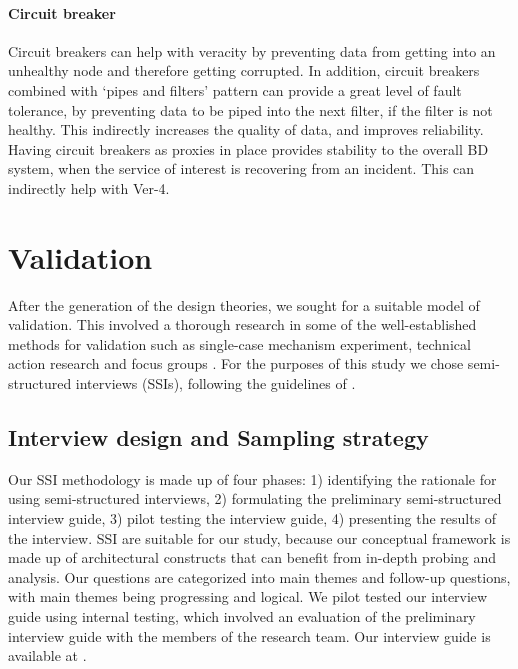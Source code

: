 \documentclass[a4paper,11pt,article,oneside]{memoir}
\begin{document}
\subsubsection{Circuit breaker}
 
 Circuit breakers can help with veracity by preventing data from getting into an unhealthy node and therefore getting corrupted. In addition, circuit breakers combined with `pipes and filters' pattern can provide a great level of fault tolerance, by preventing data to be piped into the next filter, if the filter is not healthy. This indirectly increases the quality of data, and improves reliability. Having circuit breakers as proxies in place provides stability to the overall BD system, when the service of interest is recovering from an incident. This can indirectly help with Ver-4.


\chapter{Validation}

After the generation of the design theories, we sought for a suitable model of validation. This involved a thorough research in some of the well-established methods for validation such as single-case mechanism experiment, technical action research and focus groups \citep{wieringa2014design}. For the purposes of this study we chose semi-structured interviews (SSIs), following the guidelines of \citet{kallio2016systematic}. 

\section{Interview design and Sampling strategy}
Our SSI methodology is made up of four phases: 1) identifying the rationale for using semi-structured interviews, 2) formulating the preliminary semi-structured interview guide, 3) pilot testing the interview guide, 4) presenting the results of the interview. SSI are suitable for our study, because our conceptual framework is made up of architectural constructs that can benefit from in-depth probing and analysis. Our questions are categorized into main themes and follow-up questions, with main themes being progressing and logical. We pilot tested our interview guide using internal testing, which involved an evaluation of the preliminary interview guide with the members of the research team. Our interview guide is available at \cite{interviewGuide}.
\end{document}
